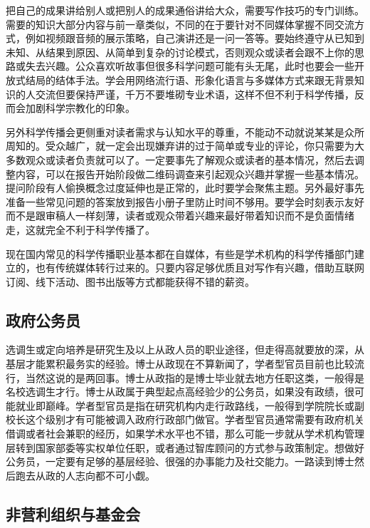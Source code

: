 \documentclass[]{tufte-book}
\begin{document}
把自己的成果讲给别人或把别人的成果通俗讲给大众，需要写作技巧的专门训练。需要的知识大部分内容与前一章类似，不同的在于要针对不同媒体掌握不同交流方式，例如视频跟音频的展示策略，自己演讲还是一问一答等。要始终遵守从已知到未知、从结果到原因、从简单到复杂的讨论模式，否则观众或读者会跟不上你的思路或失去兴趣。公众喜欢听故事但很多科学问题可能有头无尾，此时也要会一些开放式结局的结体手法。学会用网络流行语、形象化语言与多媒体方式来跟无背景知识的人交流但要保持严谨，千万不要堆砌专业术语，这样不但不利于科学传播，反而会加剧科学宗教化的印象。

另外科学传播会更侧重对读者需求与认知水平的尊重，不能动不动就说某某是众所周知的。受众越广，就一定会出现嫌弃讲的过于简单或专业的评论，你只需要为大多数观众或读者负责就可以了。一定要事先了解观众或读者的基本情况，然后去调整内容，可以在报告开始阶段做二维码调查来引起观众兴趣并掌握一些基本情况。提问阶段有人偷换概念过度延伸也是正常的，此时要学会聚焦主题。另外最好事先准备一些常见问题的答案放到报告小册子里防止时间不够用。要学会时刻表示友好而不是跟审稿人一样刻薄，读者或观众带着兴趣来最好带着知识而不是负面情绪走，这就完全不利于科学传播了。

现在国内常见的科学传播职业基本都在自媒体，有些是学术机构的科学传播部门建立的，也有传统媒体转行过来的。只要内容足够优质且对写作有兴趣，借助互联网订阅、线下活动、图书出版等方式都能获得不错的薪资。

\hypertarget{ux653fux5e9cux516cux52a1ux5458}{%
\subsection{政府公务员}\label{ux653fux5e9cux516cux52a1ux5458}}

选调生或定向培养是研究生及以上从政人员的职业途径，但走得高就要放的深，从基层才能累积最务实的经验。博士从政现在不算新闻了，学者型官员目前也比较流行，当然这说的是两回事。博士从政指的是博士毕业就去地方任职这类，一般得是名校选调生才行。博士从政属于典型起点高经验少的公务员，如果没有政绩，很可能就业即巅峰。学者型官员是指在研究机构内走行政路线，一般得到学院院长或副校长这个级别才有可能被调入政府行政部门做官。学者型官员通常需要有政府机关借调或者社会兼职的经历，如果学术水平也不错，那么可能一步就从学术机构管理层转到国家部委等实权单位任职，或者通过智库顾问的方式参与政策制定。想做好公务员，一定要有足够的基层经验、很强的办事能力及社交能力。一路读到博士然后跑去从政的人志向都不可小觑。

\hypertarget{ux975eux8425ux5229ux7ec4ux7ec7ux4e0eux57faux91d1ux4f1a}{%
\subsection{非营利组织与基金会}\label{ux975eux8425ux5229ux7ec4ux7ec7ux4e0eux57faux91d1ux4f1a}}
\end{document}
